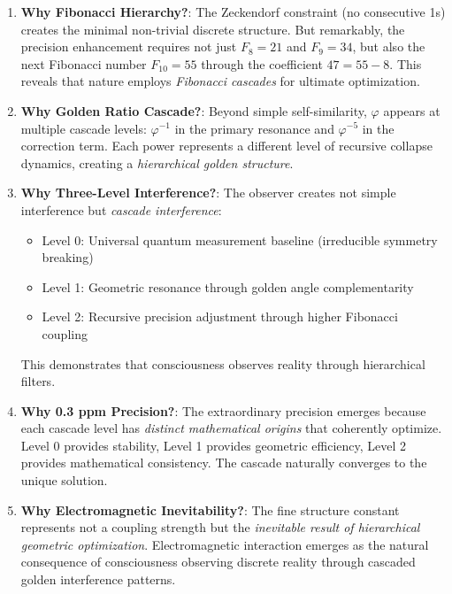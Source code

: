 \documentclass[%
 reprint,
 amsmath,amssymb,
 aps,
 prd,
 10pt,
 nofootinbib,      %
 longbibliography  %
]{revtex4-2}
\theoremstyle{definition}
\theoremstyle{remark}
\begin{document}
\begin{enumerate}
\item \textbf{Why Fibonacci Hierarchy?}: The Zeckendorf constraint (no consecutive 1s) creates the minimal non-trivial discrete structure. But remarkably, the precision enhancement requires not just $F_8 = 21$ and $F_9 = 34$, but also the next Fibonacci number $F_{10} = 55$ through the coefficient $47 = 55 - 8$. This reveals that nature employs \emph{Fibonacci cascades} for ultimate optimization.

\item \textbf{Why Golden Ratio Cascade?}: Beyond simple self-similarity, $\varphi$ appears at multiple cascade levels: $\varphi^{-1}$ in the primary resonance and $\varphi^{-5}$ in the correction term. Each power represents a different level of recursive collapse dynamics, creating a \emph{hierarchical golden structure}.

\item \textbf{Why Three-Level Interference?}: The observer creates not simple interference but \emph{cascade interference}:
   \begin{itemize}
   \item Level 0: Universal quantum measurement baseline (irreducible symmetry breaking)
   \item Level 1: Geometric resonance through golden angle complementarity 
   \item Level 2: Recursive precision adjustment through higher Fibonacci coupling
   \end{itemize}
   This demonstrates that consciousness observes reality through hierarchical filters.

\item \textbf{Why 0.3 ppm Precision?}: The extraordinary precision emerges because each cascade level has \emph{distinct mathematical origins} that coherently optimize. Level 0 provides stability, Level 1 provides geometric efficiency, Level 2 provides mathematical consistency. The cascade naturally converges to the unique solution.

\item \textbf{Why Electromagnetic Inevitability?}: The fine structure constant represents not a coupling strength but the \emph{inevitable result of hierarchical geometric optimization}. Electromagnetic interaction emerges as the natural consequence of consciousness observing discrete reality through cascaded golden interference patterns.
\end{enumerate}
\end{document}
